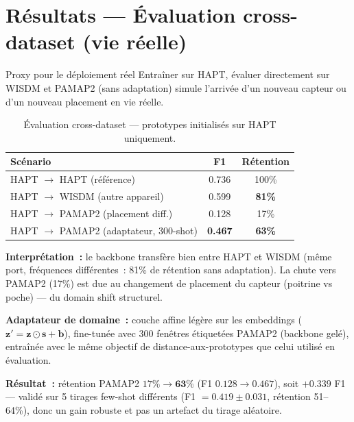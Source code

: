\documentclass[12pt, a4paper]{article}
\begin{document}
\section{Résultats --- Évaluation cross-dataset (vie réelle)}

\begin{boitebleue}{Proxy pour le déploiement réel}
Entraîner sur HAPT, évaluer directement sur WISDM et PAMAP2
(sans adaptation) simule l'arrivée d'un nouveau capteur ou
d'un nouveau placement en vie réelle.
\end{boitebleue}

\begin{table}[h]
\centering
\caption{Évaluation cross-dataset --- prototypes initialisés sur HAPT uniquement.}
\begin{tabular}{lcc}
\toprule
\textbf{Scénario} & \textbf{F1} & \textbf{Rétention} \\
\midrule
HAPT $\to$ HAPT (référence)         & 0.736 & 100\% \\
HAPT $\to$ WISDM (autre appareil)   & 0.599 & \textbf{81\%} \\
HAPT $\to$ PAMAP2 (placement diff.) & 0.128 & 17\% \\
HAPT $\to$ PAMAP2 (adaptateur, 300-shot) & \textbf{0.467} & \textbf{63\%} \\
\bottomrule
\end{tabular}
\end{table}

\textbf{Interprétation~:} le backbone transfère bien entre HAPT et WISDM
(même port, fréquences différentes~: 81\% de rétention sans adaptation).
La chute vers PAMAP2 (17\%) est due au changement de placement du capteur
(poitrine vs poche) --- du domain shift structurel.

\begin{boitegrise}
\textbf{Adaptateur de domaine~:} couche affine légère sur les embeddings
($\mathbf{z}' = \mathbf{z} \odot \mathbf{s} + \mathbf{b}$), fine-tunée avec
300 fenêtres étiquetées PAMAP2 (backbone gelé), entraînée avec le même
objectif de distance-aux-prototypes que celui utilisé en évaluation.

\textbf{Résultat~:} rétention PAMAP2 $17\% \to \mathbf{63\%}$
(F1 $0.128 \to 0.467$), soit $+0.339$ F1 --- validé sur 5 tirages
few-shot différents (F1 $= 0.419 \pm 0.031$, rétention 51--64\%),
donc un gain robuste et pas un artefact du tirage aléatoire.
\end{boitegrise}
\end{document}
